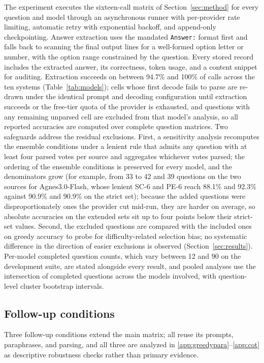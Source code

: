 The experiment executes the sixteen-call matrix of Section~\ref{sec:method} for every question and model through an asynchronous runner with per-provider rate limiting, automatic retry with exponential backoff, and append-only checkpointing. Answer extraction uses the mandated \texttt{Answer:} format first and falls back to scanning the final output lines for a well-formed option letter or number, with the option range constrained by the question. Every stored record includes the extracted answer, its correctness, token usage, and a content snippet for auditing. Extraction succeeds on between 94.7\% and 100\% of calls across the ten systems (Table~\ref{tab:models}); cells whose first decode fails to parse are re-drawn under the identical prompt and decoding configuration until extraction succeeds or the free-tier quota of the provider is exhausted, and questions with any remaining unparsed cell are excluded from that model's analysis, so all reported accuracies are computed over complete question matrices. Two safeguards address the residual exclusions. First, a sensitivity analysis recomputes the ensemble conditions under a lenient rule that admits any question with at least four parsed votes per source and aggregates whichever votes parsed; the ordering of the ensemble conditions is preserved for every model, and the denominators grow (for example, from 33 to 42 and 39 questions on the two sources for Agnes3.0-Flash, whose lenient SC-6 and PE-6 reach 88.1\% and 92.3\% against 90.9\% and 90.9\% on the strict set); because the added questions were disproportionately ones the provider cut mid-run, they are harder on average, so absolute accuracies on the extended sets sit up to four points below their strict-set values. Second, the excluded questions are compared with the included ones on greedy accuracy to probe for difficulty-related selection bias; no systematic difference in the direction of easier exclusions is observed (Section~\ref{sec:results}). Per-model completed question counts, which vary between 12 and 90 on the development suite, are stated alongside every result, and pooled analyses use the intersection of completed questions across the models involved, with question-level cluster bootstrap intervals.

\subsection{Follow-up conditions}

Three follow-up conditions extend the main matrix; all reuse its prompts, paraphrases, and parsing, and all three are analyzed in \ref{app:greedypara}--\ref{app:cot} as descriptive robustness checks rather than primary evidence.

